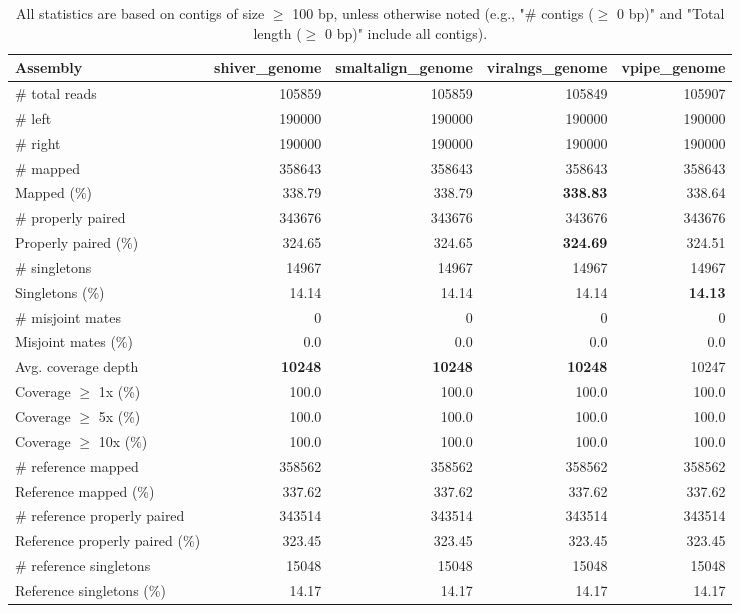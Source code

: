\documentclass[12pt,a4paper]{article}
\begin{document}
\begin{table}[ht]
\begin{center}
\caption{All statistics are based on contigs of size $\geq$ 100 bp, unless otherwise noted (e.g., "\# contigs ($\geq$ 0 bp)" and "Total length ($\geq$ 0 bp)" include all contigs).}
\begin{tabular}{|l*{4}{|r}|}
\hline
Assembly & shiver\_genome & smaltalign\_genome & viralngs\_genome & vpipe\_genome \\ \hline
\# total reads & 105859 & 105859 & 105849 & 105907 \\ \hline
\# left & 190000 & 190000 & 190000 & 190000 \\ \hline
\# right & 190000 & 190000 & 190000 & 190000 \\ \hline
\# mapped & 358643 & 358643 & 358643 & 358643 \\ \hline
Mapped (\%) & 338.79 & 338.79 & {\bf 338.83} & 338.64 \\ \hline
\# properly paired & 343676 & 343676 & 343676 & 343676 \\ \hline
Properly paired (\%) & 324.65 & 324.65 & {\bf 324.69} & 324.51 \\ \hline
\# singletons & 14967 & 14967 & 14967 & 14967 \\ \hline
Singletons (\%) & 14.14 & 14.14 & 14.14 & {\bf 14.13} \\ \hline
\# misjoint mates & 0 & 0 & 0 & 0 \\ \hline
Misjoint mates (\%) & 0.0 & 0.0 & 0.0 & 0.0 \\ \hline
Avg. coverage depth & {\bf 10248} & {\bf 10248} & {\bf 10248} & 10247 \\ \hline
Coverage $\geq$ 1x (\%) & 100.0 & 100.0 & 100.0 & 100.0 \\ \hline
Coverage $\geq$ 5x (\%) & 100.0 & 100.0 & 100.0 & 100.0 \\ \hline
Coverage $\geq$ 10x (\%) & 100.0 & 100.0 & 100.0 & 100.0 \\ \hline
\# reference mapped & 358562 & 358562 & 358562 & 358562 \\ \hline
Reference mapped (\%) & 337.62 & 337.62 & 337.62 & 337.62 \\ \hline
\# reference properly paired & 343514 & 343514 & 343514 & 343514 \\ \hline
Reference properly paired (\%) & 323.45 & 323.45 & 323.45 & 323.45 \\ \hline
\# reference singletons & 15048 & 15048 & 15048 & 15048 \\ \hline
Reference singletons (\%) & 14.17 & 14.17 & 14.17 & 14.17 \\ \hline

\end{tabular}
\end{center}
\end{table}
\end{document}
